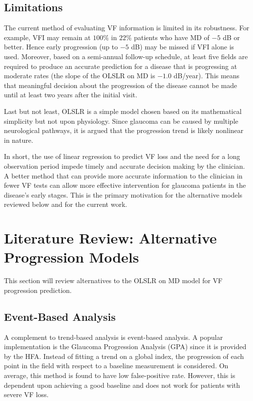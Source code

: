\subsection{Limitations}

The current method of evaluating \ac{VF} information is limited in its robustness. For example, \ac{VFI} may remain at $100\%$ in $22\%$ patients who have MD of $-5$ dB or better. Hence early progression (up to $-5$ dB) may be missed if VFI alone is used. Moreover, based on a semi-annual follow-up schedule, at least five fields are required to produce an accurate prediction for a disease that is progressing at moderate rates (the slope of the OLSLR on MD is $-1.0$ dB/year). \cite{Chauhan2008} This means that meaningful decision about the progression of the disease cannot be made until at least two years after the initial visit. 

Last but not least, \ac{OLSLR} is a simple model chosen based on its mathematical simplicity but not upon physiology. Since glaucoma can be caused by multiple neurological pathways, it is argued that the progression trend is likely nonlinear in nature. \cite{Pathak2013} 

In short, the use of linear regression to predict \ac{VF} loss and the need for a long observation period impede timely and accurate decision making by the clinician. A better method that can provide more accurate information to the clinician in fewer \ac{VF} tests can allow more effective intervention for glaucoma patients in the disease's early stages. This is the primary motivation for the alternative models reviewed below and for the current work.

\section{Literature Review: Alternative Progression Models}

This section will review alternatives to the \ac{OLSLR} on MD model for \ac{VF} progression prediction. 

\subsection{Event-Based Analysis}

A complement to trend-based analysis is event-based analysis. A popular implementation is the Glaucoma Progression Analysis (GPA) since it is provided by the \ac{HFA}. Instead of fitting a trend on a global index, the progression of each point in the field with respect to a baseline measurement is considered. On average, this method is found to have low false-positive rate. However, this is dependent upon achieving a good baseline and does not work for patients with severe VF loss. \cite{Aref2017}

